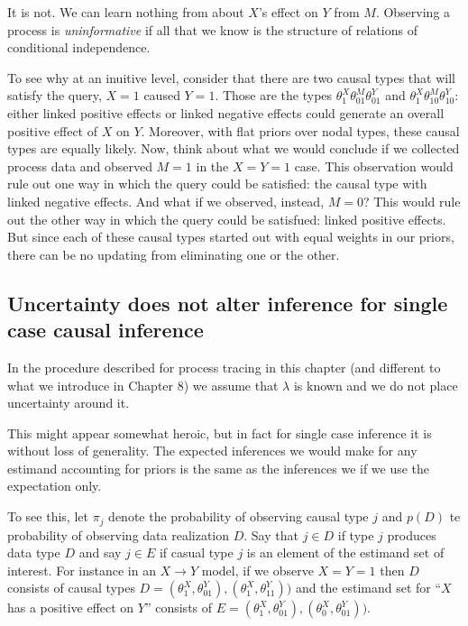 \documentclass[
  12pt,
]{book}
\begin{document}
It is not. We can learn nothing from about \(X\)'s effect on \(Y\) from \(M\). Observing a process is \emph{uninformative} if all that we know is the structure of relations of conditional independence.

To see why at an inuitive level, consider that there are two causal types that will satisfy the query, \(X=1\) caused \(Y=1\). Those are the types \(\theta^X_1 \theta^M_{01} \theta^Y_{01}\) and \(\theta^X_1 \theta^M_{10} \theta^Y_{10}\): either linked positive effects or linked negative effects could generate an overall positive effect of \(X\) on \(Y\). Moreover, with flat priors over nodal types, these causal types are equally likely. Now, think about what we would conclude if we collected process data and observed \(M=1\) in the \(X=Y=1\) case. This observation would rule out one way in which the query could be satisfied: the causal type with linked negative effects. And what if we observed, instead, \(M=0\)? This would rule out the other way in which the query could be satisfued: linked positive effects. But since each of these causal types started out with equal weights in our priors, there can be no updating from eliminating one or the other.

\hypertarget{uncertainty-does-not-alter-inference-for-single-case-causal-inference}{%
\subsection{Uncertainty does not alter inference for single case causal inference}\label{uncertainty-does-not-alter-inference-for-single-case-causal-inference}}

In the procedure described for process tracing in this chapter (and different to what we introduce in Chapter 8) we assume that \(\lambda\) is known and we do not place uncertainty around it.

This might appear somewhat heroic, but in fact for single case inference it is without loss of generality. The expected inferences we would make for any estimand accounting for priors is the same as the inferences we if we use the expectation only.

To see this, let \(\pi_j\) denote the probability of observing causal type \(j\) and \(p(D)\) te probability of observing data realization \(D\). Say that \(j \in D\) if type \(j\) produces data type \(D\) and say \(j \in E\) if casual type \(j\) is an element of the estimand set of interest. For instance in an \(X \rightarrow Y\) model, if we observe \(X=Y=1\) then \(D\) consists of causal types \(D={(\theta^X_1, \theta^Y_{01}), (\theta^X_1, \theta^Y_{11})})\) and the estimand set for ``\(X\) has a positive effect on \(Y\)'' consists of \(E={(\theta^X_1, \theta^Y_{01}), (\theta^X_0, \theta^Y_{01})})\).
\end{document}
